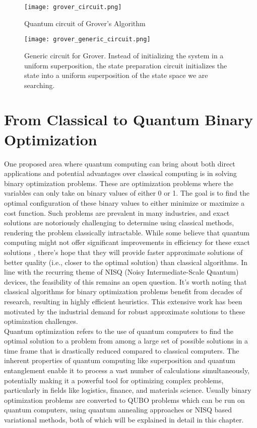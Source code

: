 \documentclass[12pt,a4paper]{report}
\begin{document}
\begin{figure}[!h]
    \centering
    \texttt{[image: grover\_circuit.png]}
    \caption{Quantum circuit of Grover's Algorithm}
    \label{fig:grov_circuit}
\end{figure}

\begin{figure}[!h]
    \centering
    \texttt{[image: grover\_generic\_circuit.png]}
    \caption{Generic circuit for Grover. Instead of initializing the system in a uniform superposition, the state preparation circuit initializes the state into a uniform superposition of the state space we are searching.}
    \label{fig:grov_generic}
\end{figure}

\chapter{From Classical to Quantum Binary Optimization}

One proposed area where quantum computing can bring about both direct applications and potential advantages over classical computing is in solving binary optimization problems. These are optimization problems where the variables can only take on binary values of either 0 or 1. The goal is to find the optimal configuration of these binary values to either minimize or maximize a cost function. Such problems are prevalent in many industries, and exact solutions are notoriously challenging to determine using classical methods, rendering the problem classically intractable. While some believe that quantum computing might not offer significant improvements in efficiency for these exact solutions \cite{chapt_2_intro}, there's hope that they will provide faster approximate solutions of better quality (i.e., closer to the optimal solution) than classical algorithms. In line with the recurring theme of NISQ (Noisy Intermediate-Scale Quantum) devices, the feasibility of this remains an open question. It's worth noting that classical algorithms for binary optimization problems benefit from decades of research, resulting in highly efficient heuristics. This extensive work has been motivated by the industrial demand for robust approximate solutions to these optimization challenges.
\\

\noindent
Quantum optimization refers to the use of quantum computers to find the optimal solution to a problem from among a large set of possible solutions in a time frame that is drastically reduced compared to classical computers. The inherent properties of quantum computing like superposition and quantum entanglement enable it to process a vast number of calculations simultaneously, potentially making it a powerful tool for optimizing complex problems, particularly in fields like logistics, finance, and materials science. Usually binary optimization problems are converted to QUBO problems which can be run on quantum computers, using quantum annealing approaches or NISQ based variational methods, both of which will be explained in detail in this chapter.
\end{document}
